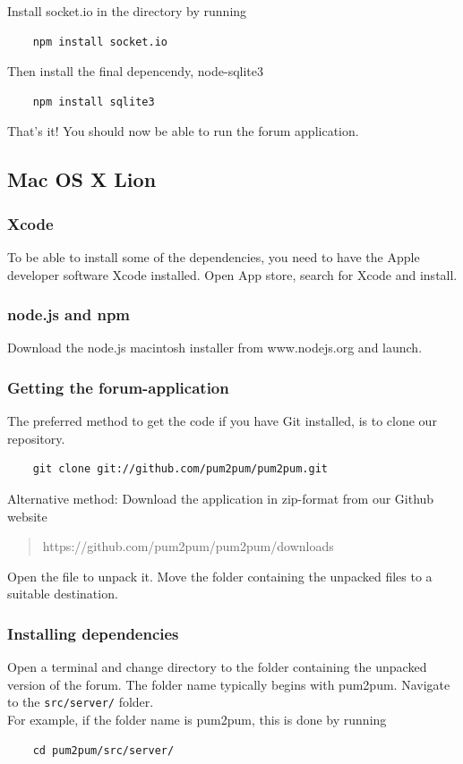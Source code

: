 \documentclass[a4paper, 12pt, titlepage]{article}
\begin{document}
	Install socket.io in the directory by running

	\begin{lstlisting}
	npm install socket.io
	\end{lstlisting}

	Then install the final depencendy, node-sqlite3

	\begin{lstlisting}
	npm install sqlite3
	\end{lstlisting}

	That's it! You should now be able to run the forum application.



	\subsection{Mac OS X Lion}
	\label{sec:osxinstall}


	\subsubsection{Xcode}
	To be able to install some of the dependencies, you need to have the Apple developer software Xcode installed. Open App store, search for Xcode and install.


	\subsubsection{node.js and npm}
	Download the node.js macintosh installer from www.nodejs.org and launch.

	\subsubsection{Getting the forum-application}
	The preferred method to get the code if you have Git installed, is to clone our repository.
	\begin{lstlisting}
	git clone git://github.com/pum2pum/pum2pum.git
	\end{lstlisting}

	Alternative method: Download the application in zip-format from our Github website
	\begin{quote}
	https://github.com/pum2pum/pum2pum/downloads
	\end{quote}
	Open the file to unpack it. Move the folder containing the unpacked files to a suitable destination.\\

	\subsubsection{Installing dependencies}
	Open a terminal and change directory to the folder containing the unpacked version of the forum. The folder name typically begins with pum2pum. Navigate to the \lstinline{src/server/} folder.\\
	For example, if the folder name is pum2pum, this is done by running
	\begin{lstlisting}
	cd pum2pum/src/server/
	\end{lstlisting}
\end{document}
